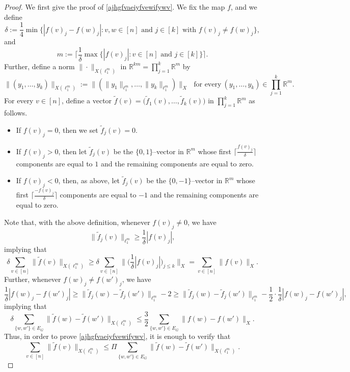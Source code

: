 \documentclass[11pt,leqno]{amsart}
\theoremstyle{remark}
\theoremstyle{plain}
\newcommand{\R}{\mathbb{R}}
\begin{document}
\begin{proof}
We first give the proof of \eqref{ajhgfvaeiyfvewifywv}. We fix the map $f$, and we define
$$ \delta:=\frac{1}{4}\min\big\{|f(v)_j-f(w)_j|\colon v,w\in[n] \text { and } j\in [k] \text{ with } f(v)_j\neq f(w)_j\big\}, $$
and
$$ m:=\Big\lceil\frac{1}{\delta} \max\big\{|f(v)_j|\colon v\in[n] \text{ and } j\in [k]\big\} \Big\rceil. $$
Further, define a norm $\|\cdot\|_{X(\ell_1^m)}$ in $\R^{km}=\prod_{j=1}^k \R^m$ by
$$ \|(y_1,\dots,y_k)\|_{X(\ell_1^m)}:= \big\|(\|y_1\|_{\ell_1^m},\dots,\|y_k\|_{\ell_1^m})\big\|_X
\ \ \ \text{for every} \ (y_1,\dots,y_k)\in \prod_{j=1}^k \R^m. $$
For every $v\in[n]$, define a vector $\tilde f(v)=\big(\tilde f_1(v),\dots,\tilde f_k(v)\big)$ in $\prod_{j=1}^k \R^m$ as follows.
\begin{itemize}
    \item If $f(v)_j=0$, then we set $\tilde f_j(v)=0$.
    \item If $f(v)_j>0$, then let $\tilde f_j(v)$
    be the $\{0,1\}$--vector in $\R^m$ whose first
    $\big\lceil\frac{f(v)_j}{\delta}\big\rceil$ components are
    equal to $1$ and the remaining components are equal to zero.
    \item If $f(v)_j<0$, then, as above, let
    $\tilde f_j(v)$
    be the $\{0,-1\}$--vector in $\R^m$ whose first
    $\big\lceil\frac{-f(v)_j}{\delta}\big\rceil$ components are
    equal to $-1$ and the remaining components are equal to zero.
\end{itemize}
Note that, with the above definition, whenever $f(v)_j\neq 0$, we have
$$
\|\tilde f_j(v)\|_{\ell_1^m}\geqslant \frac{1}{\delta}|f(v)_j|,
$$
implying that
$$
\delta \sum_{v\in[n]}\|\tilde f(v)\|_{X(\ell_1^m)}
\geqslant
\delta \sum_{v\in[n]}\Big\|
\Big(\frac{1}{\delta}|f(v)_j|\Big)_{j\leqslant k}\Big\|_X
= \sum_{v\in[n]}\|f(v)\|_X.
$$
Further, whenever $f(w)_j\neq f(w')_j$, we have
$$
\frac{1}{\delta}|f(w)_j-f(w')_j|
\geqslant
\|\tilde f_j(w)-\tilde f_j(w')\|_{\ell_1^m}-2
\geqslant
\|\tilde f_j(w)-\tilde f_j(w')\|_{\ell_1^m}
-\frac{1}{2}\cdot \frac{1}{\delta}|f(w)_j-f(w')_j|,
$$
implying that
$$ \delta\sum_{\{w,w'\}\in E_G}\|\tilde f(w)-\tilde f(w')\|_{X(\ell_1^m)}
\leqslant \frac{3}{2}\sum_{\{w,w'\}\in E_G}\|f(w)-f(w')\|_X. $$
Thus, in order to prove \eqref{ajhgfvaeiyfvewifywv},
it is enough to verify that
\begin{equation}\label{eq005}
\sum_{v\in[n]}\|\tilde f(v)\|_{X(\ell_1^m)} \leqslant \Pi
\sum_{\{w,w'\}\in E_G}\|\tilde f(w)-\tilde f(w')\|_{X(\ell_1^m)}.

\end{equation}
\end{proof}
\end{document}
